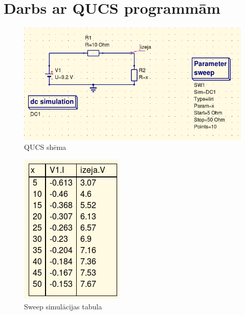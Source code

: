 \documentclass{report}
\begin{document}
\section{Darbs ar QUCS programmām}
\begin{figure}[!h]
    \centering
    \includegraphics[width=\textwidth, height=\textheight, keepaspectratio]{QUCS.png}
    \caption{QUCS shēma}
    \label{fig:2.3}
    \end{figure}
 
\begin{figure}[t] 
\centering
    \includegraphics[width=\textwidth, height=220 pt, keepaspectratio]{sweep.png}
    \caption{Sweep simulācijas tabula}
    \label{fig:2.4}
\end{figure}

\newpage
\end{document}
